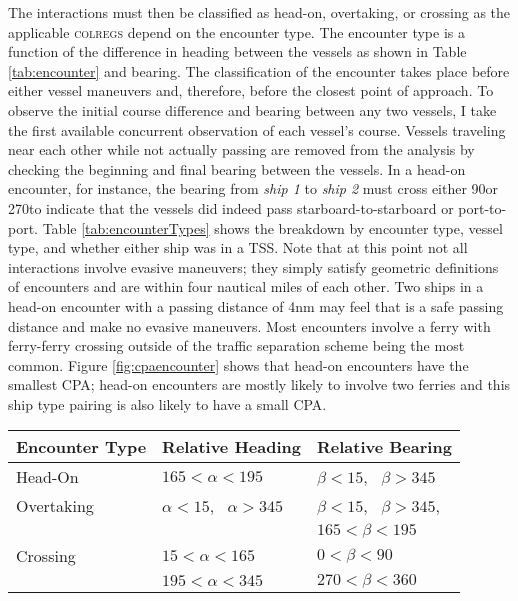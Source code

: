 \documentclass[twoside,symmetric,notoc]{tufte-book}
\begin{document}
\par{%
The interactions must then be classified as head-on, overtaking, or crossing as the applicable \textsc{colregs} depend on the encounter type. The encounter type is a function of the difference in heading between the vessels as shown in Table \ref{tab:encounter} and bearing. The classification of the encounter takes place before either vessel maneuvers and, therefore, before the closest point of approach. To observe the initial course difference and bearing between any two vessels, I take the first available concurrent observation of each vessel's course. Vessels traveling near each other while not actually passing are removed from the analysis by checking the beginning and final bearing between the vessels. In a head-on encounter, for instance, the bearing from \textit{ship 1} to \textit{ship 2} must cross either 90\textdegree or 270\textdegree to indicate that the vessels did indeed pass starboard-to-starboard or port-to-port. Table \ref{tab:encounterTypes} shows the breakdown by encounter type, vessel type, and whether either ship was in a TSS. Note that at this point not all interactions involve evasive maneuvers; they simply satisfy geometric definitions of encounters and are within four nautical miles of each other. Two ships in a head-on encounter with a passing distance of 4nm may feel that is a safe passing distance and make no evasive maneuvers. Most encounters involve a ferry with ferry-ferry crossing outside of the traffic separation scheme being the most common. Figure \ref{fig:cpaencounter} shows that head-on encounters have the smallest CPA; head-on encounters are mostly likely to involve two ferries and this ship type pairing is also likely to have a small CPA.
\begin{table}
\begin{tabular}{|l|l l|}
     \hline
        Encounter Type & Relative Heading  & Relative Bearing\\
        \hline
        \hline
        Head-On & $165 < \alpha < 195$  &  $\beta < 15$, \,  $\beta > 345$\\
        \hline
        Overtaking &  $\alpha < 15$, \,  $\alpha > 345$ &  $\beta < 15$, \,  $\beta > 345$, \\
                &                                       & $165 < \beta < 195$\\
        \hline
        Crossing & $15 < \alpha < 165$ &  $0 < \beta < 90$\\
                 & $195 < \alpha < 345$ &  $270 < \beta < 360$\\

\end{tabular}
\end{table}}
\end{document}
